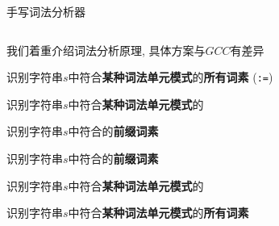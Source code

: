 
\begin{frame}{}

  \begin{center}
    手写词法分析器
  \end{center}
\end{frame}

\begin{frame}{}

  \begin{columns}
  \end{columns}

  \vspace{0.50cm}
  \begin{center}
    我们着重介绍词法分析原理, 具体方案与$GCC$有差异
  \end{center}
\end{frame}

\begin{frame}{}
  \begin{center}
    识别字符串$s$中符合{\bf 某种词法单元模式}的{\bf 所有词素}
    \ws \quad \ifkw \quad \elsekw \quad \id \quad \blue{\intnum \quad \floatnum \quad \scinum}
    \quad \relop \quad \assign\; (\texttt{:=})

    \pause
    \vspace{0.80cm}
    识别字符串$s$中符合{\bf 某种词法单元模式}的

    \pause
    \vspace{0.80cm}
    识别字符串$s$中符合的{\bf 前缀词素}
  \end{center}
\end{frame}

\begin{frame}{}
  \begin{center}
    识别字符串$s$中符合的{\bf 前缀词素}

    \vspace{0.80cm}

    \vspace{0.80cm}
    识别字符串$s$中符合{\bf 某种词法单元模式}的

    \vspace{0.80cm}

    \vspace{0.80cm}
    识别字符串$s$中符合{\bf 某种词法单元模式}的{\bf 所有词素}
  \end{center}
\end{frame}

